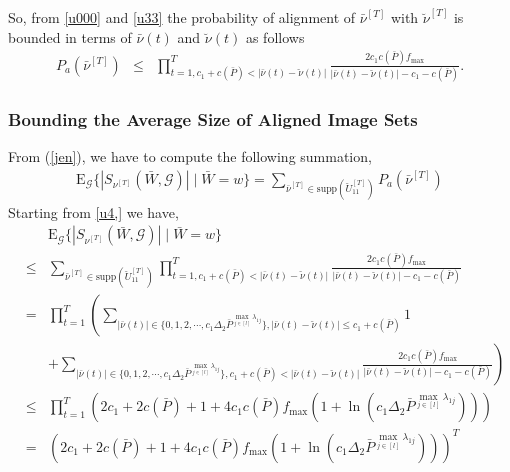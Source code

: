 \documentclass[11pt]{article}
\begin{document}
So, from \eqref{u000} and \eqref{u33} the probability of alignment of $\bar{\nu}^{[T]}$ with $\breve{\nu}^{[T]}$ is bounded in terms of  $\bar{\nu}(t)$ and $\breve{\nu}(t)$ as follows
\begin{eqnarray}
P_a(\bar{\nu}^{[T]})&\le&\prod_{t=1,c_1+c(\bar{P})<\left|\bar{\nu}(t)-\breve{\nu}(t)\right|}^T\frac{2c_1c(\bar{P})f_{\max}}{\left|\bar{\nu}(t)-\breve{\nu}(t)\right|-c_1-c(\bar{P})}\label{u4}.
\end{eqnarray}


\subsubsection{Bounding the Average Size of Aligned Image Sets}
From (\ref{jen}), we have to compute the following summation,
\begin{eqnarray}
\mbox{E}_{\mathcal{G}}\{|S_{\nu^{[T]}}(\bar{W},\mathcal{G})|\mid \bar{W}=w\}=\sum_{\bar{\nu}^{[T]}\in\mbox{supp}(\breve{U}_{11}^{[T]})}P_a(\bar{\nu}^{[T]})\label{u4,}
\end{eqnarray}
Starting from \eqref{u4,} we have,
\begin{eqnarray}
&&\mbox{E}_{\mathcal{G}}\{|S_{\nu^{[T]}}(\bar{W},\mathcal{G})|\mid \bar{W}=w\}\nonumber\\
&\le&\sum_{\bar{\nu}^{[T]}\in\mbox{supp}(\breve{U}_{11}^{[T]})}\prod_{t=1,c_1+c(\bar{P})<\left|\bar{\nu}(t)-\breve{\nu}(t)\right|}^T\frac{2c_1c(\bar{P})f_{\max}}{\left|\bar{\nu}(t)-\breve{\nu}(t)\right|-c_1-c(\bar{P})}\label{u5}\\
&=&\prod_{t=1}^T\left(\sum_{|\bar{\nu}(t)|\in \{0,1,2,\cdots,c_1\Delta_2\bar{P}^{\max_{j\in[l]}\lambda_{1j}}\},\left|\bar{\nu}(t)-\breve{\nu}(t)\right|\le c_1+c(\bar{P})}1\right.\nonumber\\
&&\left.+\sum_{|\bar{\nu}(t)|\in \{0,1,2,\cdots,c_1\Delta_2\bar{P}^{\max_{j\in[l]}\lambda_{1j}}\},c_1+c(\bar{P})<\left|\bar{\nu}(t)-\breve{\nu}(t)\right|}\frac{2c_1c(\bar{P})f_{\max}}{\left|\bar{\nu}(t)-\breve{\nu}(t)\right|-c_1-c(\bar{P})}\right)\label{u6}\\
&\le&\prod_{t=1}^T\left(2c_1+2c(\bar{P})+1+4c_1c(\bar{P})f_{\max}\left(1+\ln\left(c_1\Delta_2\bar{P}^{\max_{j\in[l]}\lambda_{1j}}\right)\right)\right)\label{u7}\\
&=&{\left(2c_1+2c(\bar{P})+1+4c_1c(\bar{P})f_{\max}\left(1+\ln\left(c_1\Delta_2\bar{P}^{\max_{j\in[l]}\lambda_{1j}}\right)\right)\right)}^T\label{u8}
\end{eqnarray}
\end{document}
